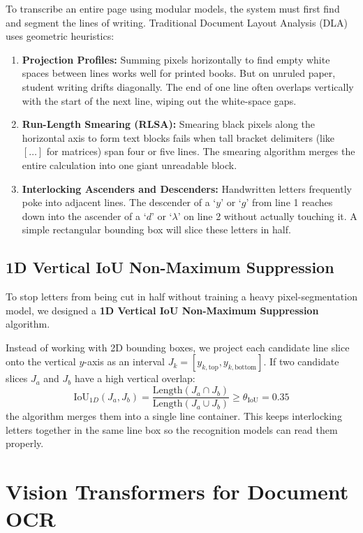 To transcribe an entire page using modular models, the system must first find and segment the lines of writing. Traditional Document Layout Analysis (DLA) uses geometric heuristics:
\begin{enumerate}
    \item \textbf{Projection Profiles:} Summing pixels horizontally to find empty white spaces between lines works well for printed books. But on unruled paper, student writing drifts diagonally. The end of one line often overlaps vertically with the start of the next line, wiping out the white-space gaps.
    \item \textbf{Run-Length Smearing (RLSA):} Smearing black pixels along the horizontal axis to form text blocks fails when tall bracket delimiters (like $[ \dots ]$ for matrices) span four or five lines. The smearing algorithm merges the entire calculation into one giant unreadable block.
    \item \textbf{Interlocking Ascenders and Descenders:} Handwritten letters frequently poke into adjacent lines. The descender of a `$y$' or `$g$' from line 1 reaches down into the ascender of a `$d$' or `$\lambda$' on line 2 without actually touching it. A simple rectangular bounding box will slice these letters in half.
\end{enumerate}

\subsection{1D Vertical IoU Non-Maximum Suppression}
To stop letters from being cut in half without training a heavy pixel-segmentation model, we designed a \textbf{1D Vertical IoU Non-Maximum Suppression} algorithm.

Instead of working with 2D bounding boxes, we project each candidate line slice onto the vertical $y$-axis as an interval $J_k = [y_{k, \text{top}}, y_{k, \text{bottom}}]$. If two candidate slices $J_a$ and $J_b$ have a high vertical overlap:
\begin{equation}
\text{IoU}_{1D}(J_a, J_b) = \frac{\text{Length}(J_a \cap J_b)}{\text{Length}(J_a \cup J_b)} \ge \theta_{\text{IoU}} = 0.35
\end{equation}
the algorithm merges them into a single line container. This keeps interlocking letters together in the same line box so the recognition models can read them properly.

\section{Vision Transformers for Document OCR}
\label{sec:vision_transformers}

